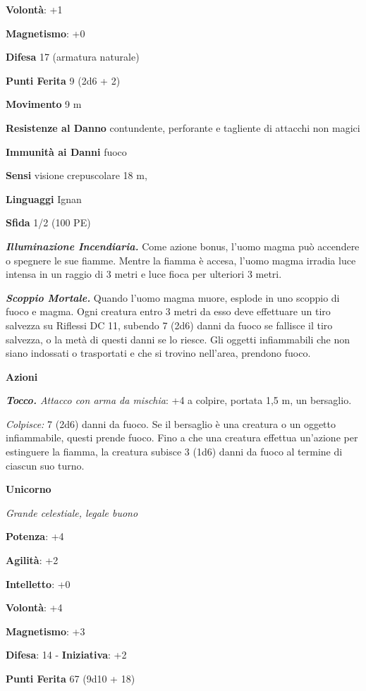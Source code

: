 \begin{multicols}{2}
\textbf{Volontà}: +1

\textbf{Magnetismo}: +0

\textbf{Difesa} 17 (armatura naturale)

\textbf{Punti Ferita} 9 (2d6 + 2)

\textbf{Movimento} 9 m

\textbf{Resistenze al Danno} contundente, perforante e tagliente di
attacchi non magici

\textbf{Immunità ai Danni} fuoco

\textbf{Sensi} visione crepuscolare 18 m, 

\textbf{Linguaggi} Ignan

\textbf{Sfida} 1/2 (100 PE)

\emph{\textbf{Illuminazione Incendiaria.}} Come azione bonus, l'uomo
magma può accendere o spegnere le sue fiamme. Mentre la fiamma è accesa,
l'uomo magma irradia luce intensa in un raggio di 3 metri e luce fioca
per ulteriori 3 metri.

\emph{\textbf{Scoppio Mortale.}} Quando l'uomo magma muore, esplode in
uno scoppio di fuoco e magma. Ogni creatura entro 3 metri da esso deve
effettuare un tiro salvezza su Riflessi DC 11, subendo 7 (2d6) danni da
fuoco se fallisce il tiro salvezza, o la metà di questi danni se lo
riesce. Gli oggetti infiammabili che non siano indossati o trasportati e
che si trovino nell'area, prendono fuoco.

\textbf{Azioni}

\emph{\textbf{Tocco.} Attacco con arma da mischia}: +4 a colpire,
portata 1,5 m, un bersaglio.

\emph{Colpisce:} 7 (2d6) danni da fuoco. Se il bersaglio è una creatura
o un oggetto infiammabile, questi prende fuoco. Fino a che una creatura
effettua un'azione per estinguere la fiamma, la creatura subisce 3 (1d6)
danni da fuoco al termine di ciascun suo turno.

\textbf{Unicorno}

\emph{Grande celestiale, legale buono}

\textbf{Potenza}: +4

\textbf{Agilità}: +2

\textbf{Intelletto}: +0

\textbf{Volontà}: +4

\textbf{Magnetismo}: +3

\textbf{Difesa}: 14 - \textbf{Iniziativa}: +2

\textbf{Punti Ferita} 67 (9d10 + 18)


\end{multicols}
